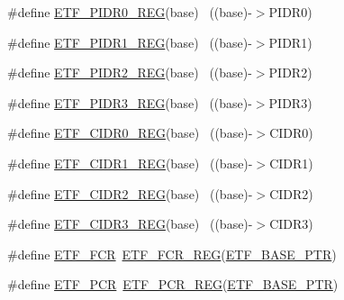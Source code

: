 \begin{DoxyCompactItemize}
\item 
\#define \hyperlink{group___e_t_f___register___accessor___macros_ga9e41167372f1530189363d41dbbfd95f}{E\+T\+F\+\_\+\+P\+I\+D\+R0\+\_\+\+R\+EG}(base)                                        ~((base)-\/$>$P\+I\+D\+R0)
\item 
\#define \hyperlink{group___e_t_f___register___accessor___macros_ga8b5d8e019a3a93b4a7e281b2ac481f3a}{E\+T\+F\+\_\+\+P\+I\+D\+R1\+\_\+\+R\+EG}(base)                                        ~((base)-\/$>$P\+I\+D\+R1)
\item 
\#define \hyperlink{group___e_t_f___register___accessor___macros_ga4119e645336b38b14c438854463865ab}{E\+T\+F\+\_\+\+P\+I\+D\+R2\+\_\+\+R\+EG}(base)                                        ~((base)-\/$>$P\+I\+D\+R2)
\item 
\#define \hyperlink{group___e_t_f___register___accessor___macros_ga6d9e5ced04cbea1843586e45cc8ea979}{E\+T\+F\+\_\+\+P\+I\+D\+R3\+\_\+\+R\+EG}(base)                                        ~((base)-\/$>$P\+I\+D\+R3)
\item 
\#define \hyperlink{group___e_t_f___register___accessor___macros_gab4e786e2f33bbea0b33fd3250cdb2499}{E\+T\+F\+\_\+\+C\+I\+D\+R0\+\_\+\+R\+EG}(base)                                        ~((base)-\/$>$C\+I\+D\+R0)
\item 
\#define \hyperlink{group___e_t_f___register___accessor___macros_gaf70f578ef4ae9dc6d0d1e27c3b57d0f2}{E\+T\+F\+\_\+\+C\+I\+D\+R1\+\_\+\+R\+EG}(base)                                        ~((base)-\/$>$C\+I\+D\+R1)
\item 
\#define \hyperlink{group___e_t_f___register___accessor___macros_gacbbd3a362f90d06779e066903034ea6f}{E\+T\+F\+\_\+\+C\+I\+D\+R2\+\_\+\+R\+EG}(base)                                        ~((base)-\/$>$C\+I\+D\+R2)
\item 
\#define \hyperlink{group___e_t_f___register___accessor___macros_ga30f319179915e151dc415ba158aea9bf}{E\+T\+F\+\_\+\+C\+I\+D\+R3\+\_\+\+R\+EG}(base)                                        ~((base)-\/$>$C\+I\+D\+R3)
\item 
\#define \hyperlink{group___e_t_f___register___accessor___macros_ga5ddd46da8c2006023383bbb35d1e8729}{E\+T\+F\+\_\+\+F\+CR}~\hyperlink{group___e_t_f___register___accessor___macros_ga3a6090c96a97fedec3eecc70692c9281}{E\+T\+F\+\_\+\+F\+C\+R\+\_\+\+R\+EG}(\hyperlink{group___e_t_f___peripheral_ga46da3f879a5311a0651d7908021daa5e}{E\+T\+F\+\_\+\+B\+A\+S\+E\+\_\+\+P\+TR})
\item 
\#define \hyperlink{group___e_t_f___register___accessor___macros_ga38f9c7ef7629c226823af6d743946b9d}{E\+T\+F\+\_\+\+P\+CR}~\hyperlink{group___e_t_f___register___accessor___macros_ga7f09a0cf0ce3ad36eaebb2ece85082bb}{E\+T\+F\+\_\+\+P\+C\+R\+\_\+\+R\+EG}(\hyperlink{group___e_t_f___peripheral_ga46da3f879a5311a0651d7908021daa5e}{E\+T\+F\+\_\+\+B\+A\+S\+E\+\_\+\+P\+TR})

\end{DoxyCompactItemize}
